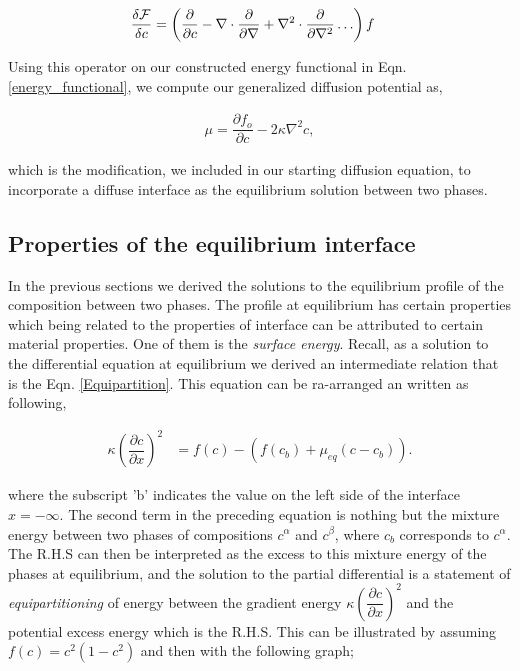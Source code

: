 \documentclass[english]{iambook}
\begin{document}
\begin{align}
 \dfrac{\delta {\cal F}}{\delta c} &= \left(\dfrac{\partial}{\partial c} - 
 \nabla \cdot \dfrac{\partial}{\partial \nabla} + \nabla^{2}\cdot\dfrac{\partial }{\partial \nabla^{2}}\ldots\right)f  
 \label{variational_derivative}
\end{align}

Using this operator on our constructed energy functional in Eqn.\ref{energy_functional}, we compute our 
generalized diffusion potential as, 

\begin{align}
 \mu = \dfrac{\partial f_o}{\partial c} - 2\kappa \nabla^{2}c,
\end{align}

which is the modification, we included in our starting diffusion 
equation, to incorporate a diffuse interface as the equilibrium
solution between two phases.

\subsection{Properties of the equilibrium interface}
In the previous sections we derived the solutions to the 
equilibrium profile of the composition between two phases.
The profile at equilibrium has certain properties which 
being related to the properties of interface can be 
attributed to certain material properties. One of them 
is the \textit{surface energy}. Recall, as a solution 
to the differential equation at equilibrium we derived
an intermediate relation that is the Eqn. \ref{Equipartition}.
This equation can be ra-arranged an written as following, 

\begin{align}
 \kappa\left(\dfrac{\partial c}{\partial x}\right)^{2} &= f(c) - \left(f(c_b)  + \mu_{eq}\left(c - c_b\right)\right).
\end{align}

where the subscript 'b' indicates the value on the left side
of the interface $x=-\infty$. The second term in the preceding
equation is nothing but the mixture energy between two phases
of compositions $c^{\alpha}$ and $c^{\beta}$, where $c_b$ 
corresponds to $c^{\alpha}$. The R.H.S can then be interpreted
as the excess to this mixture energy of the phases at equilibrium,
and the solution to the partial differential is a statement of
\textit{equipartitioning} of energy between the gradient energy
$\kappa\left(\dfrac{\partial c}{\partial x}\right)^{2}$ and the 
potential excess energy which is the R.H.S. This can be illustrated
by assuming $f(c)=c^{2}\left(1-c^{2}\right)$ and then with  the
following graph;
\end{document}
